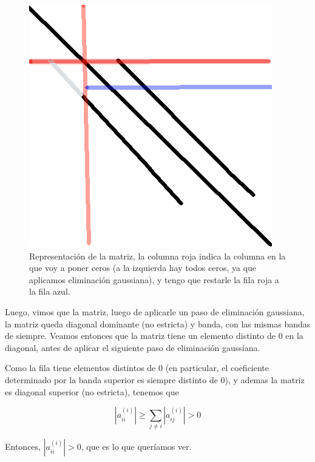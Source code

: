 \begin{figure}[H]
    \begin{center}
\includegraphics[scale=0.3]{imgs/expl.png}
\end{center}
\caption{\footnotesize{Representación de la matriz, la columna roja indica la columna en la que voy a poner ceros (a la izquierda hay todos ceros, ya que aplicamos eliminación gaussiana), y tengo que restarle la fila roja a la fila azul.}}
 \end{figure}

Luego, vimos que la matriz, luego de aplicarle un paso de eliminación gaussiana, la matriz queda diagonal dominante (no estricta) y banda, con las mismas bandas de siempre. Veamos entonces que la matriz tiene un elemento distinto de 0 en la diagonal, antes de aplicar el siguiente paso de eliminación gaussiana.

Como la fila tiene elementos distintos de 0 (en particular, el coeficiente determinado por la banda superior es siempre distinto de 0), y ademas la matriz es diagonal superior (no estricta), tenemos que

\[
  |a_{ii}^{(i)}| \geq \sum_{j \neq i} |a_{ij}^{(i)}| > 0
\]

Entonces, $|a_{ii}^{(i)}| > 0$, que es lo que queríamos ver.


